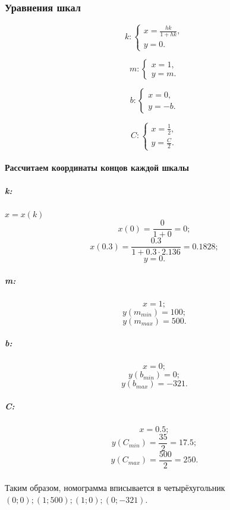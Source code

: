 \subsubsection{Уравнения шкал}

$$k: \left\{
\begin{array}{l}
	x = \frac{hk}{1+hk},\\
	y = 0.
\end{array}
\right.
$$

$$m: \left\{
\begin{array}{l}
	x = 1,\\
	y = m.
\end{array}
\right.
$$

$$b: \left\{
\begin{array}{l}
	x = 0,\\
	y = -b.
\end{array}
\right.
$$

$$
C: \left\{
\begin{array}{l}
	x = \frac{1}{2}, \\
	y = \frac{C}{2}.
\end{array}
\right.
$$

\paragraph{Рассчитаем координаты концов каждой шкалы}
\subparagraph{k:}
$x = x(k)$
$$x(0) = \frac{0}{1+0} = 0;$$
$$x(0.3) = \frac{0.3}{1+0.3 \cdot 2.136} = 0.1828;$$
$$y = 0.$$

\subparagraph{m:}
$$x = 1;$$
$$y(m_{min}) = 100;$$
$$y(m_{max}) = 500.$$

\subparagraph{b:}
$$x = 0;$$
$$y(b_{min}) = 0;$$
$$y(b_{max}) = -321.$$

\subparagraph{C:}
$$x = 0.5;$$
$$y(C_{min}) = \frac{35}{2} = 17.5;$$
$$y(C_{max}) = \frac{500}{2} = 250.$$

\subparagraph{}Таким образом, номограмма вписывается в четырёхугольник $(0; 0); (1; 500); (1; 0); (0; -321)$.